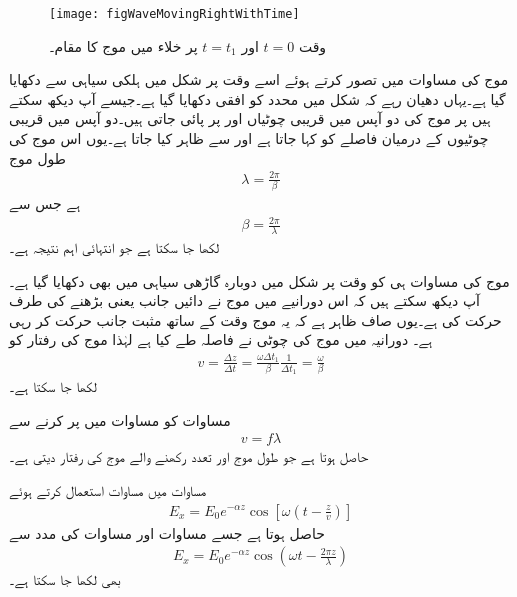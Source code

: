 \begin{figure}
\centering
\texttt{[image: figWaveMovingRightWithTime]}
\caption{وقت $t=0$ اور $t=t_1$ پر خلاء میں موج کا مقام۔}
\label{شکل_موج_وقت_کے_ساتھ_مثبت_چلتی_موج}
\end{figure}


موج کی مساوات  میں  تصور کرتے ہوئے اسے وقت  پر شکل  میں ہلکی سیاہی سے دکھایا گیا ہے۔یہاں دھیان رہے کہ شکل میں  محدد کو افقی دکھایا گیا ہے۔جیسے آپ دیکھ سکتے ہیں  پر موج کی دو آپس میں قریبی چوٹیاں  اور  پر پائی جاتی ہیں۔دو آپس میں قریبی چوٹیوں کے درمیان فاصلے کو  کہا جاتا ہے  اور  سے ظاہر کیا جاتا ہے۔یوں اس موج کی طول موج
\begin{align}\label{مساوات_موج_زاویائی_مستقل_اور_طول_موج_الف}
\lambda=\frac{2\pi}{\beta}
\end{align}
ہے جس سے
\begin{align}\label{مساوات_موج_زاویائی_مستقل_اور_طول_موج_ب}
\beta=\frac{2\pi}{\lambda}
\end{align}
لکھا جا سکتا ہے جو انتہائی اہم نتیجہ ہے۔

موج کی مساوات ہی کو وقت  پر شکل  میں دوبارہ گاڑھی سیاہی میں بھی دکھایا گیا ہے۔آپ دیکھ سکتے ہیں کہ اس دورانیے میں موج نے دائیں جانب یعنی  بڑھنے کی طرف حرکت کی ہے۔یوں صاف ظاہر ہے کہ یہ موج وقت کے ساتھ مثبت  جانب حرکت کر رہی ہے۔ دورانیہ  میں موج کی چوٹی نے  فاصلہ طے کیا ہے لہٰذا موج کی رفتار کو
\begin{align}\label{مساوات_موج_رفتار_اور_تعدد}
v=\frac{\Delta z}{\Delta t}=\frac{\omega \Delta t_1}{\beta} \frac{1}{\Delta t_1}=\frac{\omega}{\beta}
\end{align}
لکھا جا سکتا ہے۔

مساوات  کو  مساوات  میں پر کرنے سے
\begin{align}
v=f \lambda
\end{align}
حاصل ہوتا ہے جو  طول موج  اور  تعدد رکھنے والے موج کی رفتار  دیتی ہے۔

مساوات  میں مساوات  استعمال کرتے ہوئے
\begin{align}
E_x=E_0 e^{-\alpha z} \cos \left[ \omega \left(t-\frac{z}{v} \right)\right]
\end{align}
حاصل ہوتا ہے جسے مساوات  اور مساوات  کی مدد سے
\begin{align}
E_x=E_0 e^{-\alpha z} \cos \left(\omega  t-\frac{2 \pi z}{\lambda}\right)
\end{align}
بھی لکھا جا سکتا ہے۔


